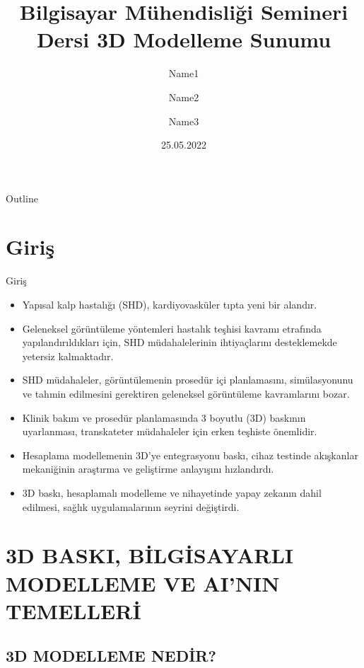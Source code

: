 \documentclass{beamer}
\title[Sunum]{Bilgisayar Mühendisliği Semineri Dersi \newline 3D Modelleme Sunumu}
\author[D. E. K. \& E. N. K. \& S. A.]{ \inst{1} Name1 \and  \inst{2} Name2 \and  \inst{3} Name3}
\institute[Bilgisayar Müh.]{\inst{1} No1 \and \inst{2} No2\and  \inst{3} No3 }
\date{25.05.2022}
\begin{document}
\begin{frame}
  \titlepage
\end{frame}

\begin{frame}{Outline}
  \tableofcontents
\end{frame}

\section{Giriş}

\begin{frame}{Giriş}

\begin{itemize}
  \item Yapısal kalp hastalığı (SHD), kardiyovasküler tıpta yeni bir alandır. 
  \item Geleneksel görüntüleme yöntemleri hastalık teşhisi kavramı etrafında yapılandırıldıkları için, SHD müdahalelerinin ihtiyaçlarını desteklemekde yetersiz kalmaktadır.
  \item SHD müdahaleler, görüntülemenin prosedür içi planlamasını, simülasyonunu ve tahmin edilmesini gerektiren geleneksel görüntüleme kavramlarını bozar. 
  \item Klinik bakım ve prosedür planlamasında 3 boyutlu (3D) baskının uyarlanması, transkateter müdahaleler için erken teşhiste önemlidir. 
  \item Hesaplama modellemenin 3D'ye entegrasyonu baskı, cihaz testinde akışkanlar mekaniğinin araştırma ve geliştirme anlayışını hızlandırdı. 
  \item 3D baskı, hesaplamalı modelleme ve nihayetinde yapay zekanın dahil edilmesi, sağlık uygulamalarının seyrini değiştirdi.  
\end{itemize}

\end{frame}

\section{3D BASKI, BİLGİSAYARLI MODELLEME VE AI'NIN TEMELLERİ}

\subsection{3D MODELLEME NEDİR?}
\end{document}
